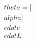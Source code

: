 \documentclass[preview]{standalone}
\begin{document}
\begin{align*}
\quad\\theta = [\quad\\alpha] \quad\\cdot c \quad\\cdot L
\end{align*}
\end{document}
